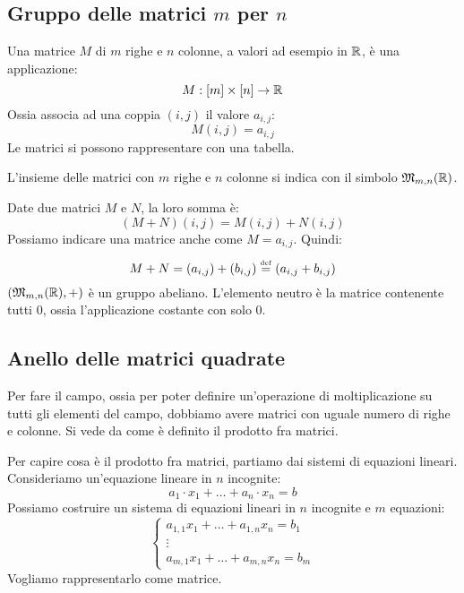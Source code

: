 \subsection{Gruppo delle matrici $m$ per $n$}

\begin{defn}
Una matrice $M$ di $m$ righe e $n$ colonne, a valori ad esempio in $\mathbb{R}$, \`e una applicazione:
\[
M : [m] \times [n] \to \mathbb{R}
\]
Ossia associa ad una coppia $(i, j)$ il valore $a_{i, j}$:
\[
M(i, j) = a_{i, j}
\]
Le matrici si possono rappresentare con una tabella.
\end{defn}

L'insieme delle matrici con $m$ righe e $n$ colonne si indica con il simbolo $\mathfrak{M}_{m,n} (\mathbb{R})$.

Date due matrici $M$ e $N$, la loro somma \`e:
\[
(M + N) (i, j) = M(i, j) + N(i, j)
\]
Possiamo indicare una matrice anche come $M = a_{i, j}$. Quindi:
\[
M + N = (a_{i, j}) + (b_{i, j}) \overset{\underset{\mathrm{def}}{}}{=} (a_{i, j} + b_{i, j})
\]
$(\mathfrak{M}_{m,n} (\mathbb{R}), +)$ \`e un gruppo abeliano. L'elemento neutro \`e la matrice contenente tutti 0, ossia l'applicazione costante con solo 0.

\subsection{Anello delle matrici quadrate}

Per fare il campo, ossia per poter definire un'operazione di moltiplicazione su tutti gli elementi del campo, dobbiamo avere matrici con uguale numero di righe e colonne. Si vede da come \`e definito il prodotto fra matrici.

Per capire cosa \`e il prodotto fra matrici, partiamo dai sistemi di equazioni lineari. Consideriamo un'equazione lineare in $n$ incognite:
\[
a_1 \cdot x_1 + \dots + a_n \cdot x_n = b
\]
Possiamo costruire un sistema di equazioni lineari in $n$ incognite e $m$ equazioni:
\[
\begin{cases}
a_{1,1} x_1 + \dots + a_{1,n} x_n = b_1 \\
\vdots \\
a_{m,1} x_1 + \dots + a_{m,n} x_n = b_m
\end{cases}
\]
Vogliamo rappresentarlo come matrice.

